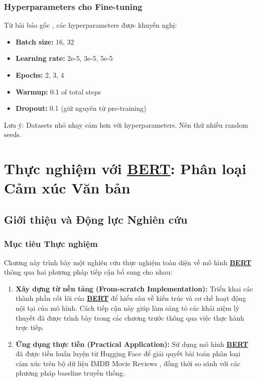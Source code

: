 \subsubsection{Hyperparameters cho Fine-tuning}
Từ bài báo gốc \cite{devlin2018bert}, các hyperparameters được khuyến nghị:
\begin{itemize}
    \item \textbf{Batch size:} 16, 32
    \item \textbf{Learning rate:} 2e-5, 3e-5, 5e-5 
    \item \textbf{Epochs:} 2, 3, 4
    \item \textbf{Warmup:} 0.1 of total steps
    \item \textbf{Dropout:} 0.1 (giữ nguyên từ pre-training)
\end{itemize}

Lưu ý: Datasets nhỏ nhạy cảm hơn với hyperparameters.
Nên thử nhiều random seeds.

\section{Thực nghiệm với \hyperref[acro:bert]{\textbf{BERT}}: Phân loại Cảm xúc Văn bản}
\label{sec:thuc_nghiem_bert}

\subsection{Giới thiệu và Động lực Nghiên cứu}
\label{ssec:gioi_thieu_dong_luc}

\subsubsection{Mục tiêu Thực nghiệm}
Chương này trình bày một nghiên cứu thực nghiệm toàn diện về mô hình \hyperref[acro:bert]{\textbf{BERT}} thông qua hai phương pháp tiếp cận bổ sung cho nhau:

\begin{enumerate}
    \item \textbf{Xây dựng từ nền tảng (From-scratch Implementation):} Triển khai các thành phần cốt lõi của \hyperref[acro:bert]{\textbf{BERT}} để hiểu sâu về kiến trúc và cơ
    chế hoạt động nội tại của mô hình. Cách tiếp cận này giúp làm sáng tỏ các khái niệm lý thuyết đã được trình bày trong các chương trước thông qua việc thực hành trực tiếp.
    \item \textbf{Ứng dụng thực tiễn (Practical Application):} Sử dụng mô hình \hyperref[acro:bert]{\textbf{BERT}} đã được tiền huấn luyện từ Hugging Face để giải quyết bài toán phân loại cảm xúc trên bộ dữ liệu IMDB Movie Reviews \cite{maas2011learning}, đồng thời so sánh với các phương pháp baseline truyền thống.
\end{enumerate}

